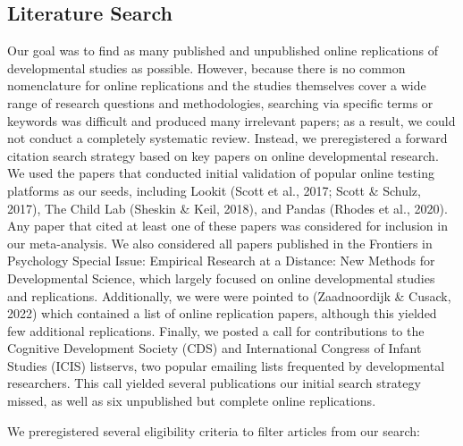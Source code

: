 \documentclass[
  man,floatsintext]{apa6}
\begin{document}
\hypertarget{literature-search}{%
\subsection{Literature Search}\label{literature-search}}

Our goal was to find as many published and unpublished online replications of developmental studies as possible. However, because there is no common nomenclature for online replications and the studies themselves cover a wide range of research questions and methodologies, searching via specific terms or keywords was difficult and produced many irrelevant papers; as a result, we could not conduct a completely systematic review. Instead, we preregistered a forward citation search strategy based on key papers on online developmental research. We used the papers that conducted initial validation of popular online testing platforms as our seeds, including Lookit (Scott et al., 2017; Scott \& Schulz, 2017), The Child Lab (Sheskin \& Keil, 2018), and Pandas (Rhodes et al., 2020). Any paper that cited at least one of these papers was considered for inclusion in our meta-analysis. We also considered all papers published in the Frontiers in Psychology Special Issue: Empirical Research at a Distance: New Methods for Developmental Science, which largely focused on online developmental studies and replications. Additionally, we were were pointed to (Zaadnoordijk \& Cusack, 2022) which contained a list of online replication papers, although this yielded few additional replications. Finally, we posted a call for contributions to the Cognitive Development Society (CDS) and International Congress of Infant Studies (ICIS) listservs, two popular emailing lists frequented by developmental researchers. This call yielded several publications our initial search strategy missed, as well as six unpublished but complete online replications.

We preregistered several eligibility criteria to filter articles from our search:
\end{document}
